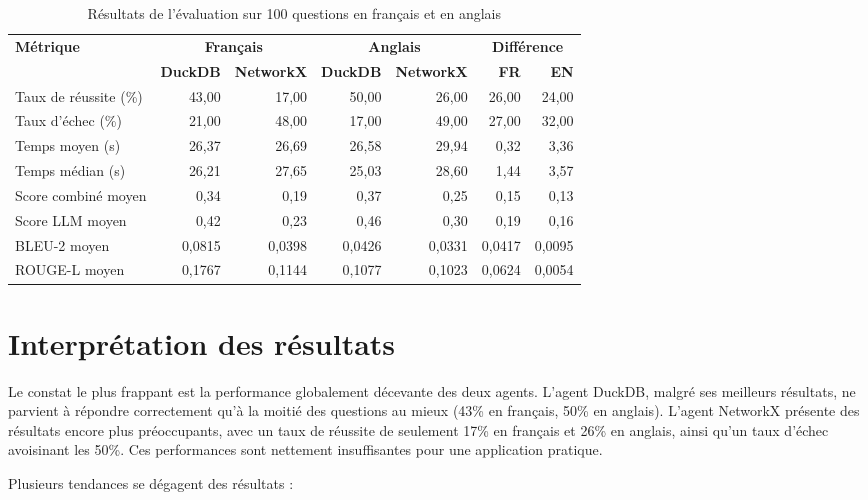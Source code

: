\documentclass[a4paper,11pt]{article}
\begin{document}
\begin{table}[H]
\small
\centering
\begin{tabular}{l|rr|rr|rr}
\toprule
\multirow{2}{*}{\textbf{Métrique}} & \multicolumn{2}{c|}{\textbf{Français}} & \multicolumn{2}{c|}{\textbf{Anglais}} & \multicolumn{2}{c}{\textbf{Différence}} \\
& \textbf{DuckDB} & \textbf{NetworkX} & \textbf{DuckDB} & \textbf{NetworkX} & \textbf{FR} & \textbf{EN} \\
\midrule
Taux de réussite (\%) & 43,00 & 17,00 & 50,00 & 26,00 & 26,00 & 24,00 \\
Taux d'échec (\%) & 21,00 & 48,00 & 17,00 & 49,00 & 27,00 & 32,00 \\
Temps moyen (s) & 26,37 & 26,69 & 26,58 & 29,94 & 0,32 & 3,36 \\
Temps médian (s) & 26,21 & 27,65 & 25,03 & 28,60 & 1,44 & 3,57 \\
Score combiné moyen & 0,34 & 0,19 & 0,37 & 0,25 & 0,15 & 0,13 \\
Score LLM moyen & 0,42 & 0,23 & 0,46 & 0,30 & 0,19 & 0,16 \\
BLEU-2 moyen & 0,0815 & 0,0398 & 0,0426 & 0,0331 & 0,0417 & 0,0095 \\
ROUGE-L moyen & 0,1767 & 0,1144 & 0,1077 & 0,1023 & 0,0624 & 0,0054 \\
\bottomrule
\end{tabular}
\caption{Résultats de l'évaluation sur 100 questions en français et en anglais}
\label{tab:resultats-eval}
\end{table}



\section{Interprétation des résultats}
\label{sec:interpretation}

Le constat le plus frappant est la performance globalement décevante des deux agents. L'agent DuckDB, malgré ses meilleurs résultats, ne parvient à répondre correctement qu'à la moitié des questions au mieux (43\% en français, 50\% en anglais). L'agent NetworkX présente des résultats encore plus préoccupants, avec un taux de réussite de seulement 17\% en français et 26\% en anglais, ainsi qu'un taux d'échec avoisinant les 50\%. Ces performances sont nettement insuffisantes pour une application pratique.

\newpage
Plusieurs tendances se dégagent des résultats :
\end{document}
